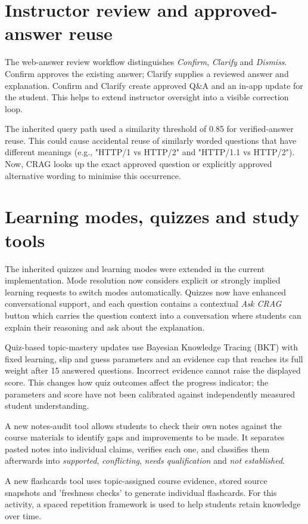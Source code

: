 \section{Instructor review and approved-answer reuse}
The web-answer review workflow distinguishes \emph{Confirm}, \emph{Clarify} and \emph{Dismiss}. Confirm approves the existing answer; Clarify supplies a reviewed answer and explanation. Confirm and Clarify create approved Q\&A and an in-app update for the student. This helps to extend instructor oversight into a visible correction loop.

The inherited query path used a similarity threshold of 0.85 for verified-answer reuse. This could cause accidental reuse of similarly worded questions that have different meanings (e.g., "HTTP/1 vs HTTP/2" and "HTTP/1.1 vs HTTP/2"). Now, CRAG looks up the exact approved question or explicitly approved alternative wording to minimise this occurrence.

\section{Learning modes, quizzes and study tools}
The inherited quizzes and learning modes were extended in the current implementation. Mode resolution now considers explicit or strongly implied learning requests to switch modes automatically. Quizzes now have enhanced conversational support, and each question contains a contextual \emph{Ask CRAG} button which carries the question context into a conversation where students can explain their reasoning and ask about the explanation.

Quiz-based topic-mastery updates use Bayesian Knowledge Tracing (BKT) with fixed learning, slip and guess parameters and an evidence cap that reaches its full weight after 15 answered questions. Incorrect evidence cannot raise the displayed score. This changes how quiz outcomes affect the progress indicator; the parameters and score have not been calibrated against independently measured student understanding.

A new notes-audit tool allows students to check their own notes against the course materials to identify gaps and improvements to be made. It separates pasted notes into individual claims, verifies each one, and classifies them afterwards into \emph{supported}, \emph{conflicting}, \emph{needs qualification} and \emph{not established}.

A new flashcards tool uses topic-assigned course evidence, stored source snapshots and 'freshness checks' to generate individual flashcards. For this activity, a spaced repetition framework is used to help students retain knowledge over time.

